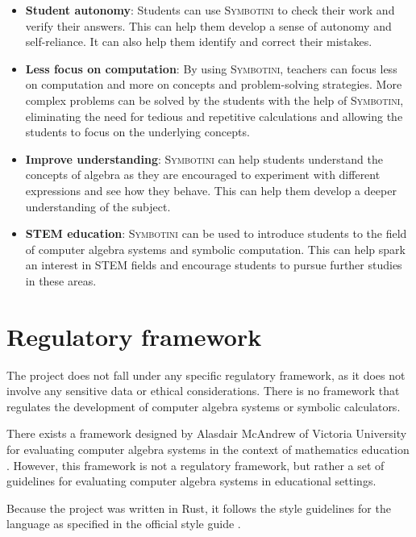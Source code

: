 \begin{itemize}
    \item \textbf{Student autonomy}: Students can use \textsc{Symbotini} to check their work and verify their answers. This can help them develop a sense of autonomy and self-reliance. It can also help them identify and correct their mistakes.
    \item \textbf{Less focus on computation}: By using \textsc{Symbotini}, teachers can focus less on computation and more on concepts and problem-solving strategies. More complex problems can be solved by the students with the help of \textsc{Symbotini}, eliminating the need for tedious and repetitive calculations and allowing the students to focus on the underlying concepts.
    \item \textbf{Improve understanding}: \textsc{Symbotini} can help students understand the concepts of algebra as they are encouraged to experiment with different expressions and see how they behave. This can help them develop a deeper understanding of the subject.
    \item \textbf{STEM education}: \textsc{Symbotini} can be used to introduce students to the field of computer algebra systems and symbolic computation. This can help spark an interest in STEM fields and encourage students to pursue further studies in these areas.
\end{itemize}

\section{Regulatory framework}\label{sec:regulatory-framework}

The project does not fall under any specific regulatory framework, as it does not involve any sensitive data or ethical considerations. There is no framework that regulates the development of computer algebra systems or symbolic calculators.

There exists a framework designed by Alasdair McAndrew of Victoria University for evaluating computer algebra systems in the context of mathematics education \parencite{mcandrewframework}. However, this framework is not a regulatory framework, but rather a set of guidelines for evaluating computer algebra systems in educational settings.

Because the project was written in Rust, it follows the style guidelines for the language as specified in the official style guide \parencite{rust-style-guide}.
